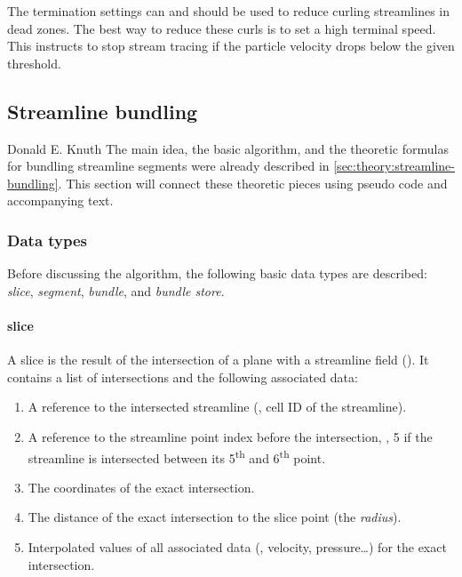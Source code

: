 The termination settings can and should be used to reduce curling streamlines in dead zones. The best way to reduce these curls is to set a high terminal speed. This instructs  to stop stream tracing if the particle velocity drops below the given threshold.


\subsection{Streamline bundling}

{Donald E. Knuth}%
%
The main idea, the basic algorithm, and the theoretic formulas for bundling streamline segments were already described in \autoref{sec:theory:streamline-bundling}. This section will connect these theoretic pieces using pseudo code and accompanying text.


\subsubsection{Data types}
Before discussing the algorithm, the following basic data types are described: \emph{slice},  \emph{segment}, \emph{bundle}, and \emph{bundle store}.

\paragraph{slice}
A slice is the result of the intersection of a plane with a streamline field (). It contains a list of intersections and the following associated data:

\begin{enumerate}
%
	\item A reference to the intersected streamline (\eg, cell \ac{ID} of the streamline).
%
	\item A reference to the streamline point index before the intersection, \eg, \num{5} if the streamline is intersected between its \num{5}\textsuperscript{th} and \num{6}\textsuperscript{th} point.
%
	\item The coordinates of the exact intersection.
%
	\item The distance of the exact intersection to the slice point (the \emph{radius}).
%
	\item Interpolated values of all associated data (\eg, velocity, pressure\dots) for the exact intersection.
%
\end{enumerate}

